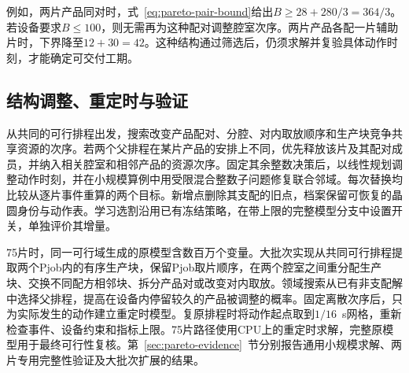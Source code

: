 例如，两片产品同对时，式~\eqref{eq:pareto-pair-bound}给出$B\ge28+280/3=364/3$。若设备要求$B\le100$，则无需再为这种配对调整腔室次序。两片产品各配一片辅助片时，下界降至$12+30=42$。这种结构通过筛选后，仍须求解并复验具体动作时刻，才能确定可交付工期。

\subsection{结构调整、重定时与验证}

从共同的可行排程出发，搜索改变产品配对、分腔、对内取放顺序和生产块竞争共享资源的次序。若两个父排程在某片产品的安排上不同，优先释放该片及其配对成员，并纳入相关腔室和相邻产品的资源次序。固定其余整数决策后，以线性规划调整动作时刻，并在小规模算例中用受限混合整数子问题修复联合邻域。每次替换均比较从逐片事件重算的两个目标。新增点删除其支配的旧点，档案保留可恢复的晶圆身份与动作表。学习选割沿用已有冻结策略，在带上限的完整模型分支中设置开关，单独评价其增量。

75片时，同一可行域生成的原模型含数百万个变量。大批次实现从共同可行排程提取两个Pjob内的有序生产块，保留Pjob取片顺序，在两个腔室之间重分配生产块、交换不同配方相邻块、拆分产品对或改变对内取放。领域搜索从已有非支配解中选择父排程，提高在设备内停留较久的产品被调整的概率。固定离散次序后，只为实际发生的动作建立重定时模型。复原排程时将动作起点取到$1/16$~s网格，重新检查事件、设备约束和指标上限。75片路径使用CPU上的重定时求解，完整原模型用于最终可行性复核。第~\ref{sec:pareto-evidence}~节分别报告通用小规模求解、两片专用完整性验证及大批次扩展的结果。
